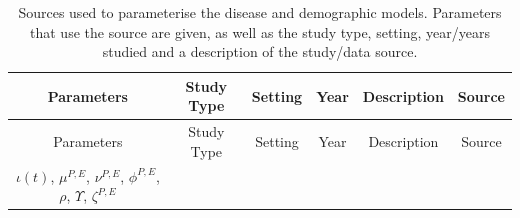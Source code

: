 \documentclass[11pt,twoside]{bristolthesis}
\begin{document}
  \begin{longtable}[]{@{}cccccc@{}}
  \caption{\label{tab:sources-tab} Sources used to parameterise the disease and demographic models. Parameters that use the source are given, as well as the study type, setting, year/years studied and a description of the study/data source.}\tabularnewline
  \toprule
  \begin{minipage}[b]{0.16\columnwidth}\centering
  Parameters\strut
  \end{minipage} & \begin{minipage}[b]{0.11\columnwidth}\centering
  Study Type\strut
  \end{minipage} & \begin{minipage}[b]{0.08\columnwidth}\centering
  Setting\strut
  \end{minipage} & \begin{minipage}[b]{0.08\columnwidth}\centering
  Year\strut
  \end{minipage} & \begin{minipage}[b]{0.29\columnwidth}\centering
  Description\strut
  \end{minipage} & \begin{minipage}[b]{0.12\columnwidth}\centering
  Source\strut
  \end{minipage}\tabularnewline
  \midrule
  \endfirsthead
  \toprule
  \begin{minipage}[b]{0.16\columnwidth}\centering
  Parameters\strut
  \end{minipage} & \begin{minipage}[b]{0.11\columnwidth}\centering
  Study Type\strut
  \end{minipage} & \begin{minipage}[b]{0.08\columnwidth}\centering
  Setting\strut
  \end{minipage} & \begin{minipage}[b]{0.08\columnwidth}\centering
  Year\strut
  \end{minipage} & \begin{minipage}[b]{0.29\columnwidth}\centering
  Description\strut
  \end{minipage} & \begin{minipage}[b]{0.12\columnwidth}\centering
  Source\strut
  \end{minipage}\tabularnewline
  \midrule
  \endhead
  \begin{minipage}[t]{0.16\columnwidth}\centering
  \(\iota(t)\),
  \(\mu^{P, E}\),
  \(\nu^{P, E}\),
  \(\phi^{P, E}\),
  \(\rho\),
  \(\Upsilon\),
  \(\zeta^{P, E}\)\strut

\end{minipage}
\end{longtable}
\end{document}
